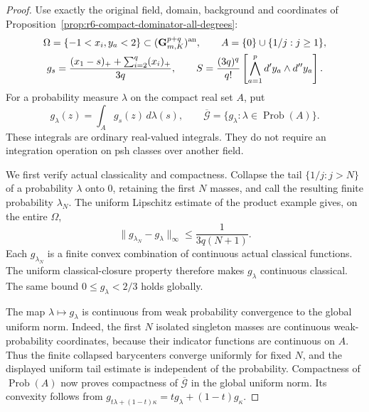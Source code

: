 \documentclass[11pt,a4paper]{article}
\numberwithin{equation}{section}
\theoremstyle{definition}
\theoremstyle{remark}
\begin{document}
\begin{proof}
Use exactly the original field, domain, background and coordinates
of Proposition~\ref{prop:r6-compact-dominator-all-degrees}:
\[
 \begin{gathered}
 \Omega=\{-1<x_i,y_a<2\}\subset
                 (\mathbf G_{m,K}^{p+q})^{\rm an},\qquad
 A=\{0\}\cup\{1/j:j\ge1\},\\
 g_s=\frac{(x_1-s)_++\sum_{i=2}^q(x_i)_+}{3q},\qquad
 S=\frac{(3q)^q}{q!}
       \left[\bigwedge_{a=1}^p d'y_a\wedge d''y_a\right].
 \end{gathered}
\]
For a probability measure $\lambda$ on the compact real set $A$, put
\[
 g_\lambda(z)=\int_A g_s(z)\,d\lambda(s),\qquad
 \overline{\mathscr G}=
               \{g_\lambda:\lambda\in\operatorname{Prob}(A)\}.
\]
These integrals are ordinary real-valued integrals. They do not
require an integration operation on psh classes over another field.

We first verify actual classicality and compactness. Collapse the
tail $\{1/j:j>N\}$ of a probability $\lambda$ onto $0$, retaining
the first $N$ masses, and call the resulting finite probability
$\lambda_N$. The uniform Lipschitz estimate of the product example
gives, on the entire $\Omega$,
\[
       \|g_{\lambda_N}-g_\lambda\|_\infty
                    \le\frac{1}{3q(N+1)}.
\]
Each $g_{\lambda_N}$ is a finite convex combination of continuous
actual classical functions. The uniform classical-closure property
therefore makes $g_\lambda$ continuous classical. The same bound
$0\le g_\lambda<2/3$ holds globally.

The map $\lambda\mapsto g_\lambda$ is continuous from weak
probability convergence to the global uniform norm. Indeed, the
first $N$ isolated singleton masses are continuous weak-probability
coordinates, because their indicator functions are continuous on
$A$. Thus the finite collapsed barycenters converge uniformly for
fixed $N$, and the displayed uniform tail estimate is independent
of the probability. Compactness of $\operatorname{Prob}(A)$ now
proves compactness of $\overline{\mathscr G}$ in the global uniform
norm. Its convexity follows from
$g_{t\lambda+(1-t)\kappa}=t g_\lambda+(1-t)g_\kappa$.


\end{proof}
\end{document}
